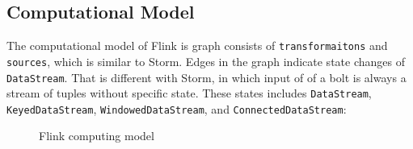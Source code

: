  

\subsection{Computational Model}

The computational model of Flink is graph consists of \texttt{transformaitons} and \texttt{sources}, which is similar to Storm. Edges in the graph indicate state changes of \texttt{DataStream}. That is different with Storm, in which input of of a bolt is always a stream of tuples without specific state. These states includes \texttt{DataStream}, \texttt{KeyedDataStream}, \texttt{WindowedDataStream}, and \texttt{ConnectedDataStream}\cite{flink_model}:

\begin{figure}
  \begin{center}
   \caption{Flink computing model}
   \label{fig:flink_model}
  \end{center}
\end{figure}

